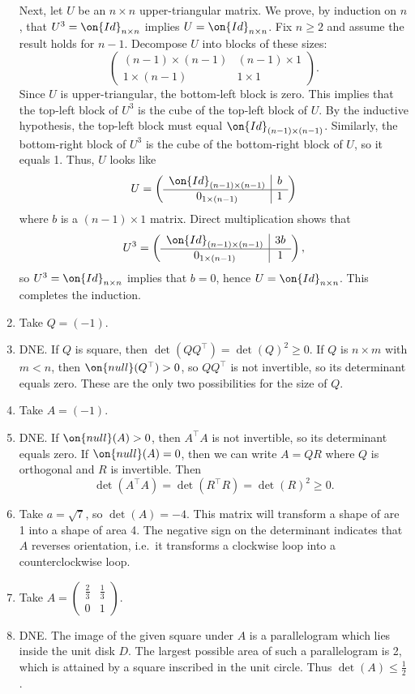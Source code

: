 \documentclass[10pt]{amsart}
\theoremstyle{mythm}
\theoremstyle{definition}
\theoremstyle{myrmk}
\begin{document}
\begin{enumerate}
		Next, let $U$ be an $n \times n$ upper-triangular matrix. We prove, by induction on $n$, that $U^3 = \on{Id}_{n \times n}$ implies $U = \on{Id}_{n \times n}$. Fix $n \ge 2$ and assume the result holds for $n-1$. Decompose $U$ into blocks of these sizes: 
		\[
			\left( \begin{array}{c|c}
				(n-1)\times (n-1) & (n-1) \times 1 \\ \hline
				1 \times (n-1) & 1 \times 1
			\end{array} \right). 
		\]
		Since $U$ is upper-triangular, the bottom-left block is zero. This implies that the top-left block of $U^3$ is the cube of the top-left block of $U$. By the inductive hypothesis, the top-left block must equal $\on{Id}_{(n-1)\times (n-1)}$. Similarly, the bottom-right block of $U^3$ is the cube of the bottom-right block of $U$, so it equals 1. Thus, $U$ looks like 
		\[
			U =  \left(\begin{array}{c|c}
			\on{Id}_{(n-1) \times (n-1)} & b \\ \hline
			0_{1 \times (n-1)} & 1
			\end{array} \right)
		\]
		where $b$ is a $(n-1) \times 1$ matrix. Direct multiplication shows that 
		\[
			U^3 = \left( \begin{array}{c|c}
			\on{Id}_{(n-1) \times (n-1)} & 3b \\ \hline
			0_{1 \times (n-1)} & 1
			\end{array} \right), 
		\]
		so $U^3 = \on{Id}_{n \times n}$ implies that $b = 0$, hence $U = \on{Id}_{n \times n}$. This completes the induction. 
		\item Take $Q = (-1)$. 
		\item DNE. If $Q$ is square, then $\det(QQ^\top) = \det(Q)^2 \ge 0$. If $Q$ is $n \times m$ with $m < n$, then $\on{null}(Q^\top) > 0$, so $QQ^\top$ is not invertible, so its determinant equals zero. These are the only two possibilities for the size of $Q$. 
		\item Take $A = (-1)$. 
		\item DNE. If $\on{null}(A) > 0$, then $A^\top A$ is not invertible, so its determinant equals zero. If $\on{null}(A) = 0$, then we can write $A = QR$ where $Q$ is orthogonal and $R$ is invertible. Then 
		\[
			\det(A^\top A) = \det(R^\top R) = \det(R)^2 \ge 0. 
		\]
		\item Take $a = \sqrt7$, so $\det(A) = -4$. This matrix will transform a shape of are 1 into a shape of area 4. The negative sign on the determinant indicates that $A$ reverses orientation, i.e.\ it transforms a clockwise loop into a counterclockwise loop. 
		\item Take $A = \begin{pmatrix}
		\frac23 & \frac13 \\
		0 & 1
		\end{pmatrix}$. 
		\item DNE. The image of the given square under $A$ is a parallelogram which lies inside the unit disk $D$. The largest possible area of such a parallelogram is 2, which is attained by a square inscribed in the unit circle. Thus $\det(A) \le \frac12$. 
	\end{enumerate} 
	
\end{document}
